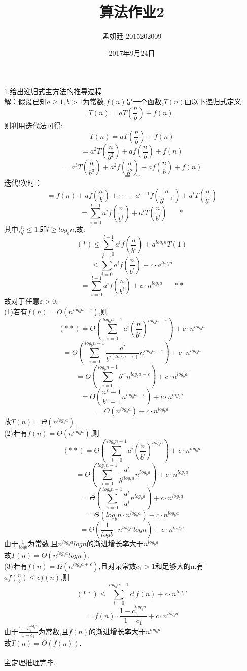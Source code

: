 \documentclass[19pt,a4paper]{article}
\title{算法作业2}
\author{孟妍廷 2015202009}
\date{2017年9月24日}
\begin{document}
\maketitle

1.给出递归式主方法的推导过程\\
\indent \quad 解：假设已知$a\ge 1,b>1$为常数,$f(n)$是一个函数,$T(n)$由以下递归式定义:$$T(n)=aT(\frac{n}{b})+f(n).$$
\indent 则利用迭代法可得:\\
$$T(n)=aT(\frac{n}{b})+f(n)$$
$$=a^2T(\frac{n}{b^2})+af(\frac{n}{b})+f(n)$$
$$=a^3T(\frac{n}{b^3})+a^2f(\frac{n}{b^2})+af(\frac{n}{b})+f(n)$$
$$=\cdot\cdot\cdot$$
\indent 迭代$l$次时：
$$=f(n)+af(\frac{n}{b})+\cdot\cdot\cdot+a^{l-1}f(\frac{n}{b^{l-1}})+a^lT(\frac{n}{b^l})$$
$$=\sum_{i=0}^{l-1}a^if(\frac{n}{b^i})+a^lT(\frac{n}{b^l})\ \ \ \ \ \ \ *$$
\indent 其中,$\frac{n}{b^l}\le 1$,即$l\ge log_bn$,故:
$$(*)\le \sum_{i=0}^{l-1}a^if(\frac{n}{b^i})+a^{ log_bn}T(1)$$
$$\le \sum_{i=0}^{l-1}a^if(\frac{n}{b^i})+c\cdot a^{ log_bn}$$
$$= \sum_{i=0}^{l-1}a^if(\frac{n}{b^i})+c\cdot  n^{log_ba}\ \ \ \ \ \ \ **$$
\indent 故对于任意$\varepsilon > 0$:\\
\indent (1)若有$f(n)=O(n^{log_ba-\varepsilon})$,则
$$(**)=O(\sum_{i=0}^{log_bn-1}a^i{(\frac{n}{b^i})}^{log_ba-\varepsilon})+c\cdot  n^{log_ba}$$
$$=O(\sum_{i=0}^{log_bn-1}\frac{a^i}{b^{i(log_ba-\varepsilon)}}n^{log_ba-\varepsilon})+c\cdot n^{log_ba}$$
$$=O(\sum_{i=0}^{log_bn-1}b^{i\varepsilon}n^{log_ba-\varepsilon})+c\cdot n^{log_ba}$$
$$=O(\frac{n^\varepsilon-1}{b^\varepsilon-1}n^{log_ba-\varepsilon})+c\cdot n^{log_ba}$$
$$=O(n^{log_ba})+c\cdot n^{log_ba}$$
\indent 故$T(n)=\Theta(n^{log_ba})$.\\

\indent (2)若有$f(n)=\Theta(n^{log_ba})$,则
$$(**)=\Theta(\sum_{i=0}^{log_bn-1}a^i{(\frac{n}{b^i})}^{log_ba})+c\cdot  n^{log_ba}$$
$$=\Theta(\sum_{i=0}^{log_bn-1}\frac{a^i}{b^{ilog_ba}}n^{log_ba})+c\cdot n^{log_ba}$$
$$=\Theta(\sum_{i=0}^{log_bn-1}\frac{a^i}{a^i}n^{log_ba})+c\cdot n^{log_ba}$$
$$=\Theta(log_bn\cdot n^{log_ba})+c\cdot n^{log_ba}$$
$$=\Theta(\frac{1}{logb}\cdot n^{log_ba}logn)+c\cdot n^{log_ba}$$
\indent 由于$\frac{1}{logb}$为常数,且$n^{log_ba}logn$的渐进增长率大于$ n^{log_ba}$\\
\indent 故$T(n)=\Theta(n^{log_ba}logn)$.\\

\indent (3)若有$f(n)=\Omega(n^{log_ba+\varepsilon})$,且对某常数$c_1>1$和足够大的n,有$af(\frac{n}{b})\le cf(n)$,则
$$(**)\le \sum_{i=0}^{log_bn-1}c_1^if(n)+c\cdot  n^{log_ba}$$
$$=f(n)\cdot \frac{1-c_1^{log_bn}}{1-c_1}+c\cdot  n^{log_ba}$$
\indent 由于$\frac{1-c_1^{log_bn}}{1-c_1}$为常数,且$f(n)$的渐进增长率大于$ n^{log_ba}$\\
\indent 故$T(n)=\Theta(f(n))$.\\
\\
\indent 主定理推理完毕.
\end{document}
